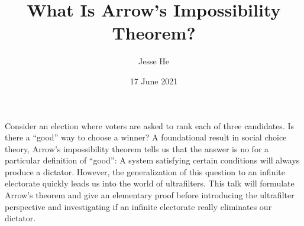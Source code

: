 \documentclass{article}
\title{What Is Arrow's Impossibility Theorem?}
\author{Jesse He}
\date{17 June 2021}
\begin{document}
\maketitle

Consider an election where voters are asked to rank each of three candidates. Is there a ``good'' way to choose a winner?
A foundational result in social choice theory, Arrow's impossibility theorem tells us that the answer is no for a particular
definition of ``good'': A system satisfying certain conditions will always produce a dictator. However, the generalization
of this question to an infinite electorate quickly leads us into the world of ultrafilters.
This talk will formulate Arrow's theorem and give an elementary proof before introducing the ultrafilter perspective
and investigating if an infinite electorate really eliminates our dictator.
\end{document}
